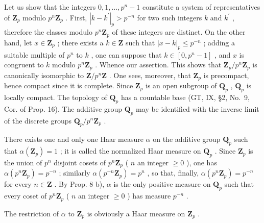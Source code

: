 Let us show that the integers \(0,1,\ldots,p^{n}-1\) constitute a system of representatives of \(\mathbf{Z}_{p}\) modulo \(p^{n}\mathbf{Z}_{p}\) . First, \(|k-k^{\prime}|_{p}>p^{-n}\) for two such integers \(k\) and \(k^{\prime}\) , therefore the classes modulo \(p^{n}\mathbf{Z}_{p}\) of these integers are distinct. On the other hand, let \(x\in\mathbf{Z}_{p}\) ; there exists a \(k\in\mathbf{Z}\) such that \(|x-k|_{p}\leqslant p^{-n}\) ; adding a suitable multiple of \(p^{n}\) to \(k\) , one can suppose that \(k\in[0,p^{n}-1]\) , and \(x\) is congruent to \(k\) modulo \(p^{n}\mathbf{Z}_{p}\) . Whence our assertion. This shows that \(\mathbf{Z}_{p}/p^{n}\mathbf{Z}_{p}\) is canonically isomorphic to \(\mathbf{Z}/p^{n}\mathbf{Z}\) . One sees, moreover, that \(\mathbf{Z}_{p}\) is precompact, hence compact since it is complete. Since \(\mathbf{Z}_{p}\) is an open subgroup of \(\mathbf{Q}_{p}\) , \(\mathbf{Q}_{p}\) is locally compact. The topology of \(\mathbf{Q}_{p}\) has a countable base (GT, IX, §2, No.~9, Cor. of Prop. 16). The additive group \(\mathbf{Q}_{p}\) may be identified with the inverse limit of the discrete groups \(\mathbf{Q}_{p}/p^{n}\mathbf{Z}_{p}\) .

There exists one and only one Haar measure \(\alpha\) on the additive group \(\mathbf{Q}_p\) such that \(\alpha(\mathbf{Z}_p) = 1\) ; it is called the normalized Haar measure on \(\mathbf{Q}_p\) . Since \(\mathbf{Z}_p\) is the union of \(p^n\) disjoint cosets of \(p^n\mathbf{Z}_p\) ( \(n\) an integer \(\geqslant 0\) ), one has \(\alpha(p^n\mathbf{Z}_p) = p^{-n}\) ; similarly \(\alpha(p^{-n}\mathbf{Z}_p) = p^n\) , so that, finally, \(\alpha(p^n\mathbf{Z}_p) = p^{-n}\) for every \(n \in \mathbf{Z}\) . By Prop. 8 b), \(\alpha\) is the only positive measure on \(\mathbf{Q}_p\) such that every coset of \(p^n\mathbf{Z}_p\) ( \(n\) an integer \(\geqslant 0\) ) has measure \(p^{-n}\) .

The restriction of \(\alpha\) to \(\mathbf{Z}_p\) is obviously a Haar measure on \(\mathbf{Z}_p\) .

